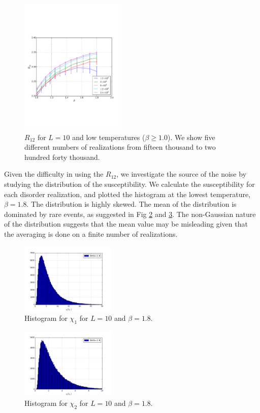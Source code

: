 \documentclass[aps,prb,twocolumn,showpacs,superscriptaddress]{revtex4}
\begin{document}
\begin{figure}[ht]
  \includegraphics[width=0.45\textwidth]{img/R12_l10_samples.pdf}
  \caption{$R_{12}$ for $L=10$ and low temperatures ($\beta \geq 1.0$). We show five different numbers of 
realizations from fifteen thousand to two hundred forty thousand.}
\label{fig:R12_l10_samples}
\end{figure}

Given the difficulty in using the $R_{12}$, we investigate the source of the noise
by studying the distribution of the susceptibility. We calculate the susceptibility
for each disorder realization, and plotted the histogram at the lowest temperature,
$\beta=1.8$. The distribution is highly skewed. The mean of the distribution is dominated by rare
events, as suggested in Fig \ref{fig:hist_chi1} and \ref{fig:hist_chi2}. 
The non-Gaussian nature of the distribution suggests that the mean value may be misleading
given that the averaging is done on a finite number of realizations. 

\begin{figure}[ht]
  \centering
  \includegraphics[width=0.4\textwidth]{img/chi1_18.png}
  \caption{Histogram for $\chi_1$ for $L=10$ and $\beta=1.8$.}
\label{fig:hist_chi1}
\end{figure}

\begin{figure}[ht]
  \centering
  \includegraphics[width=0.4\textwidth]{img/chi2_18.png}
  \caption{Histogram for $\chi_2$ for $L=10$ and $\beta=1.8$.}
\label{fig:hist_chi2}
\end{figure}
\end{document}

